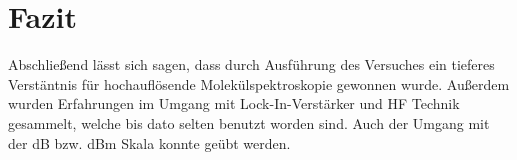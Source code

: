 
\chapter{Fazit}
\label{chap:fazit}

Abschließend lässt sich sagen, dass durch Ausführung des Versuches ein tieferes Verstäntnis für hochauflösende Molekülspektroskopie gewonnen wurde. Außerdem wurden Erfahrungen im Umgang mit Lock-In-Verstärker und HF Technik gesammelt, welche bis dato selten benutzt worden sind. Auch der Umgang mit der dB bzw. dBm Skala konnte geübt werden. 